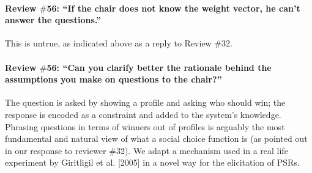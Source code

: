 \documentclass{article}
\begin{document}
\paragraph{Review $\#$56: “If the chair does not know the weight vector, he can’t answer the questions.”}
This is untrue, as indicated above as a reply to Review \#32.

\paragraph{Review $\#$56: “Can you clarify better the rationale behind the assumptions you make on questions to the chair?”}
The question is asked by showing a profile and asking who should win; the response is encoded as a constraint and added to the system’s knowledge. Phrasing questions in terms of winners out of profiles is arguably the most fundamental and natural view of what a social choice function is (as pointed out in our response to reviewer $\#$32). We adapt a mechanism used in a real life experiment by Giritligil et al. [2005] in a novel way for the elicitation of PSRs.
\end{document}
